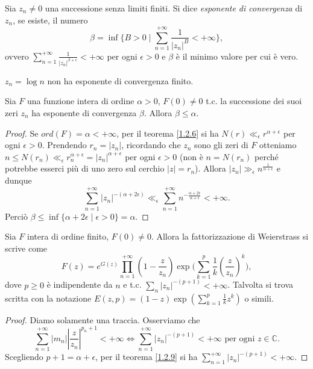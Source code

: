 \begin{defn}
  Sia $z_n\not=0$ una successione senza limiti finiti. Si dice \textit{esponente di convergenza} di $z_n$, se esiste, il numero $$\beta=\inf\{B>0 \mid \sum_{n=1}^{+\infty} \frac{1}{|z_n|^B}<+\infty\},$$
  ovvero $\displaystyle \sum_{n=1}^{+\infty} \frac{1}{|z_n|^{\beta+\epsilon}}<+\infty$ per ogni $\epsilon>0$ e $\beta$ è il minimo valore per cui è vero.
\end{defn}

\begin{ex}
  $z_n=\log{n}$ non ha esponente di convergenza finito.
\end{ex}

\begin{thm} \label{1.2.9}
  Sia $F$ una funzione intera di ordine $\alpha>0$, $F(0)\not=0$ t.c. la successione dei suoi zeri $z_n$ ha esponente di convergenza $\beta$. Allora $\beta \le \alpha$.
\end{thm}

\begin{proof}
  Se $ord(F)=\alpha<+\infty$, per il teorema \ref{1.2.6} si ha $N(r) \ll_{\epsilon} r^{\alpha+\epsilon}$ per ogni $\epsilon>0$.
  Prendendo $r_n=|z_n|$, ricordando che $z_n$ sono gli zeri di $F$ otteniamo $n \le N(r_n) \ll_{\epsilon} r_n^{\alpha+\epsilon}=|z_n|^{\alpha+\epsilon}$ per ogni $\epsilon>0$ (non è $n=N(r_n)$ perché potrebbe esserci più di uno zero sul cerchio $|z|=r_n$). Allora $|z_n| \gg_{\epsilon} n^{\frac{1}{\alpha+\epsilon}}$ e dunque
  $$\sum_{n=1}^{+\infty} |z_n|^{-(\alpha+2\epsilon)} \ll_{\epsilon} \sum_{n=1}^{+\infty} n^{-\frac{\alpha+2\epsilon}{\alpha+\epsilon}}<+\infty.$$
  Perciò $\beta \le \inf\{\alpha+2\epsilon \mid \epsilon>0\}=\alpha$.
\end{proof}

\begin{thm} \label{wfatt}
  Sia $F$ intera di ordine finito, $F(0)\not=0$. Allora la fattorizzazione di Weierstrass si scrive come
  \begin{equation} \label{wfattoformula}
    F(z)=e^{G(z)} \prod_{n=1}^{+\infty} \left(1-\frac{z}{z_n}\right)\exp\Bigg(\sum_{k=1}^p\frac{1}{k}\left(\frac{z}{z_n}\right)^k\Bigg),
  \end{equation}
  dove $p \ge 0$ è indipendente da $n$ e t.c. $\displaystyle \sum_n |z_n|^{-(p+1)}<+\infty$. Talvolta si trova scritta con la notazione $\displaystyle E(z,p)=(1-z)\exp\left(\sum_{k=1}^p\frac{1}{k}z^k\right)$ o simili.
\end{thm}

\begin{proof}
  Diamo solamente una traccia. Osserviamo che
  $$\sum_{n=1}^{+\infty} |m_n|\left|\frac{z}{z_n}\right|^{p_n+1}<+\infty \iff \sum_{n=1}^{+\infty} |z_n|^{-(p+1)}<+\infty\text{ per ogni }z \in \mathbb{C}.$$
  Scegliendo $p+1=\alpha+\epsilon$, per il teorema \ref{1.2.9} si ha $\displaystyle \sum_{n=1}^{+\infty} |z_n|^{-(p+1)}<+\infty$.
\end{proof}

